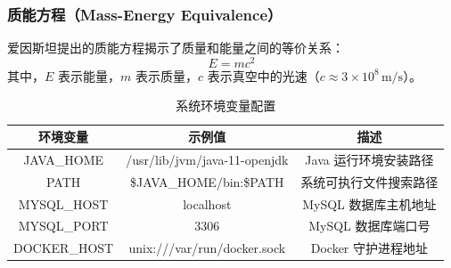\subsubsection{质能方程（Mass-Energy Equivalence）}
爱因斯坦提出的质能方程揭示了质量和能量之间的等价关系\cite{kj1991}：
\begin{equation}
    E = mc^2
    \label{eq:mass_energy}
\end{equation}
其中，$E$ 表示能量，$m$ 表示质量，$c$ 表示真空中的光速（$c \approx 3 \times 10^8 \, \text{m/s}$）。

\begin{table}[H]
    \centering
    \caption{系统环境变量配置}
    \label{tbl:env_vars}
    \begin{tabular}{c c c}
        \toprule
        \textbf{环境变量} & \textbf{示例值} & \textbf{描述} \\
        \midrule
        JAVA\_HOME & /usr/lib/jvm/java-11-openjdk & Java 运行环境安装路径 \\
        PATH & \$JAVA\_HOME/bin:\$PATH & 系统可执行文件搜索路径 \\
        MYSQL\_HOST & localhost & MySQL 数据库主机地址 \\
        MYSQL\_PORT & 3306 & MySQL 数据库端口号 \\
        DOCKER\_HOST & unix:///var/run/docker.sock & Docker 守护进程地址 \\
        \bottomrule
    \end{tabular}
\end{table}